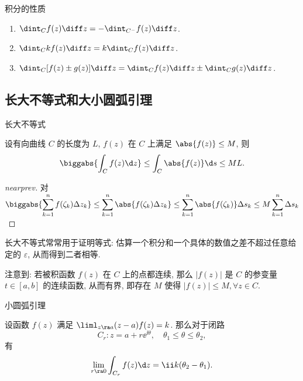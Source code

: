 \begin{frame}{积分的性质}
	\onslide<+->
	\begin{theorem}[][线性性质]
		\begin{enumerate}
			\item $\dint_Cf(z)\diff z=-\dint_{C^-}f(z)\diff z$.
			\item $\dint_Ckf(z)\diff z=k\dint_Cf(z)\diff z$.
			\item $\dint_C[f(z)\pm g(z)]\diff z
			=\dint_Cf(z)\diff z\pm\dint_Cg(z)\diff z$.
		\end{enumerate}
	\end{theorem}
\end{frame}


\subsection{长大不等式和大小圆弧引理}


\begin{frame}{长大不等式}
	\onslide<+->
	\begin{theorem*}[nearnext][长大不等式]
		设有向曲线 $C$ 的长度为 $L$, $f(z)$ 在 $C$ 上满足 $\abs{f(z)}\le M$, 则
		\[
			\biggabs{\int_C f(z)\d z}\le\int_C \abs{f(z)}\d s\le ML.
		\]
	\end{theorem*}
	\onslide<+->
	\begin{proof}[nearprev]
		对
			$\displaystyle
				\biggabs{\sum_{k=1}^n f(\zeta_k)\Delta z_k}
				\le\sum_{k=1}^n\abs{f(\zeta_k)\Delta z_k}
				\le\sum_{k=1}^n\abs{f(\zeta_k)}\Delta s_k
				\le M\sum_{k=1}^n\Delta s_k
			$
		\onslide<+->{%
			取极限即可.\qedhere
		}
	\end{proof}
	\onslide<+->
	长大不等式常常用于证明等式: 估算一个积分和一个具体的数值之差不超过任意给定的 $\varepsilon$, 从而得到二者相等.

	\onslide<+->
	注意到: 若被积函数 $f(z)$ 在 $C$ 上的点都连续, 那么 $|f(z)|$ 是 $C$ 的参变量 $t\in[a,b]$ 的连续函数, 从而有界, 即存在 $M$ 使得 $|f(z)|\le M,\forall z\in C$.
\end{frame}


\begin{frame}{小圆弧引理}
	\onslide<+->
	\begin{theorem*}[nearnext][小圆弧引理]
		设函数 $f(z)$ 满足 $\liml_{z\ra a}(z-a)f(z)=k$.
		那么对于闭路
		\[
			C_r: z=a+r\ee^{\ii \theta},\quad \theta_1\le\theta\le\theta_2,
		\]
		有
		\[
			\lim_{r\ra0}\int_{C_r}f(z)\d z
			=\ii k(\theta_2-\theta_1).
		\]
	\end{theorem*}
\end{frame}



